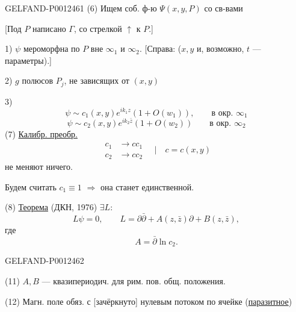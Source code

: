 \begin{GelfandAdjacentEvidence}{GELFAND-P001246}{1}
(6) Ищем соб. ф-ю $\Psi(x,y,P)$ со св-вами

[Под $P$ написано $\Gamma$, со стрелкой $\uparrow$ к $P$.]

1) $\psi$ мероморфна по $P$ вне $\infty_1$ и $\infty_2$.
[Справа: ($x,y$ и, возможно, $t$ — параметры).]

2) $g$ полюсов $P_j$, не зависящих от $(x,y)$

3)
\begin{equation*}
\psi\sim c_1(x,y)e^{ik_1z}(1+O(w_1)),\qquad\text{в окр. }\infty_1
\end{equation*}
\begin{equation*}
\psi\sim c_2(x,y)e^{ik_2\bar z}(1+O(w_2))\qquad\text{в окр. }\infty_2
\end{equation*}
(7) \underline{Калибр. преобр.}
\begin{equation*}
\begin{aligned}
c_1&\to cc_1\\
c_2&\to cc_2
\end{aligned}
\quad\bigg|\quad c=c(x,y)
\end{equation*}
не меняют ничего.

Будем считать $c_1\equiv1$ $\Rightarrow$ она станет единственной.

(8) \underline{Теорема} (ДКН, 1976) $\exists L$:
\begin{equation*}
L\psi=0,\qquad L=\partial\bar\partial+A(z,\bar z)\partial+B(z,\bar z),\tag{9}
\end{equation*}
где
\begin{equation*}
A=\bar\partial\ln c_2.\tag{10}
\end{equation*}
\end{GelfandAdjacentEvidence}
\begin{GelfandAdjacentEvidence}{GELFAND-P001246}{2}


(11) $A,B$ — квазипериодич. для рим. пов. общ. положения.

(12) Магн. поле обяз. с [зачёркнуто] нулевым потоком по ячейке (\underline{паразитное})
\end{GelfandAdjacentEvidence}
